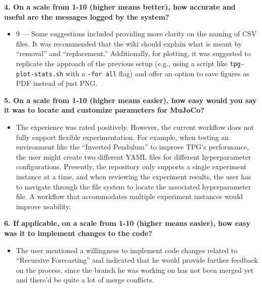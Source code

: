 \documentclass[12pt, titlepage]{article}
\begin{document}
\vspace{1em}

\textbf{4. On a scale from 1-10 (higher means better), how accurate and useful are the messages logged by the system?}

\begin{itemize}
    \item 9 --- Some suggestions included providing more clarity on the naming of CSV files.
          It was recommended that the wiki should explain what is meant by ``removal'' and
          ``replacement.'' Additionally, for plotting, it was suggested to replicate the
          approach of the previous setup (e.g., using a script like \texttt{tpg-plot-stats.sh}
          with a \texttt{-for all} flag) and offer an option to save figures as PDF instead of
          just PNG.
\end{itemize}

\vspace{1em}

\textbf{5. On a scale from 1-10 (higher means easier), how easy would you say it was to locate and customize parameters for MuJoCo?}

\begin{itemize}
    \item The experience was rated positively. However, the current workflow does not fully 
          support flexible experimentation. For example, when testing an environment like
          the ``Inverted Pendulum'' to improve TPG's performance, the user might create two
          different YAML files for different hyperparameter configurations. Presently, the
          repository only supports a single experiment instance at a time, and when reviewing the
          experiment results, the user has to navigate through the file system to locate the
          associated hyperparameter file. A workflow that accommodates multiple experiment
          instances would improve usability.
\end{itemize}

\vspace{1em}

\textbf{6. If applicable, on a scale from 1-10 (higher means easier), how easy was it to implement changes to the code?}

\begin{itemize}
    \item The user mentioned a willingness to implement code changes related to 
          ``Recursive Forecasting'' and indicated that he would provide further feedback on the process, since the branch he was working on 
          has not been merged yet and there'd be quite a lot of merge conflicts.
\end{itemize}
\end{document}
